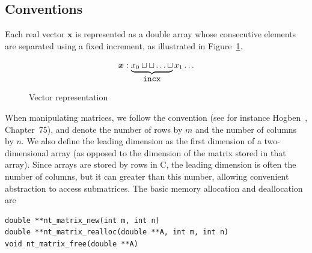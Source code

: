 \subsection{Conventions}
\label{sub:laconventions}

Each real vector $\boldsymbol{x}$ is represented as a double array
whose consecutive elements are separated using a fixed increment, as
illustrated in Figure~\ref{fig:vector}.
\begin{figure}
\[
\boldsymbol{x}: \underbrace{x_0 \sqcup \sqcup \ldots
  \sqcup}_{\mbox{\texttt{incx}}}x_1 \ldots
\]
\label{fig:vector}
\caption{Vector representation}
\end{figure}

When manipulating matrices,
we follow the \lapack{} convention (see for instance
Hogben~\cite{Hogb06}, Chapter~75), and denote the number of rows by $m$
and the number of columns by $n$.
We also define the leading dimension as the
first dimension of a two-dimensional array (as opposed to the
dimension of the matrix stored in that array).
Since arrays are stored by rows in C, the leading dimension is often the
number of columns, but it can greater than this number, allowing
convenient abstraction to access submatrices.
The basic memory allocation and deallocation are
\begin{verbatim}
double **nt_matrix_new(int m, int n)
double **nt_matrix_realloc(double **A, int m, int n)
void nt_matrix_free(double **A)
\end{verbatim}

